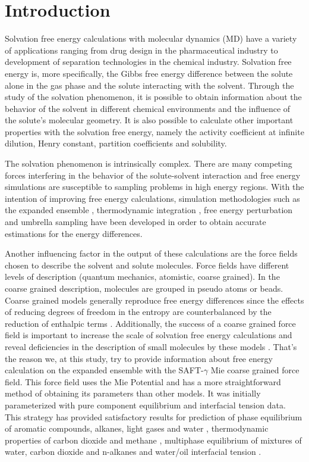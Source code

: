 \chapter{Introduction} %
\label{Chapter1} %
\pagestyle{simple}
\onehalfspacing
Solvation free energy calculations with molecular dynamics (MD) have a variety of applications ranging from drug design in the pharmaceutical industry to development of separation technologies in the chemical industry. Solvation free energy is, more specifically, the Gibbs free energy difference between the solute alone in the gas phase and the solute interacting with the solvent. Through the study of the solvation phenomenon, it is possible to obtain information about the behavior of the solvent in different chemical environments and the influence of the solute's molecular geometry. It is also possible to calculate other important properties with the solvation free energy, namely the activity coefficient at infinite dilution, Henry constant, partition coefficients and solubility. 

The solvation phenomenon is intrinsically complex. There are many competing forces interfering in the behavior of the solute-solvent interaction and free energy simulations are susceptible to sampling problems in high energy regions. With the intention of improving free energy calculations, simulation methodologies such as the expanded ensemble \cite{lyubartsev}, thermodynamic integration \cite{kirkwood1935}, free energy perturbation \cite{zwanzig1954,bennet1976,mbar} and umbrella sampling \cite{TORRIE1977187} have been developed in order to obtain accurate estimations for the energy differences. 

Another influencing factor in the output of these calculations are the force fields chosen to describe the solvent and solute molecules. Force fields have different levels of description (quantum mechanics, atomistic, coarse grained). In the coarse grained description, molecules are grouped in pseudo atoms or beads. Coarse grained models generally reproduce free energy differences since the effects of reducing degrees of freedom in the entropy are counterbalanced by the reduction of enthalpic terms \cite{kmiecik2016}. Additionally, the success of a coarse grained force field is important to increase the scale of solvation free energy calculations and reveal deficiencies in the description of small molecules by these models \cite{mobley2007,shirts2013}. That's the reason we, at this study, try to provide information about free energy calculation on the expanded ensemble with the SAFT-$\gamma$ Mie coarse grained force field. This force field uses the Mie Potential \cite{MIE} and has a more straightforward method of obtaining its parameters than other models. It was initially parameterized with pure component equilibrium and interfacial tension data. This strategy has provided satisfactory results for prediction of phase equilibrium of aromatic compounds, alkanes, light gases and water \cite{herdes2015,muller2017,lobanova2015} , thermodynamic properties of carbon dioxide and methane \cite{cassiano1}, multiphase equilibrium of mixtures of water, carbon dioxide and n-alkanes \cite{lobanova2016} and water/oil interfacial tension \cite{herdes2017}. 

